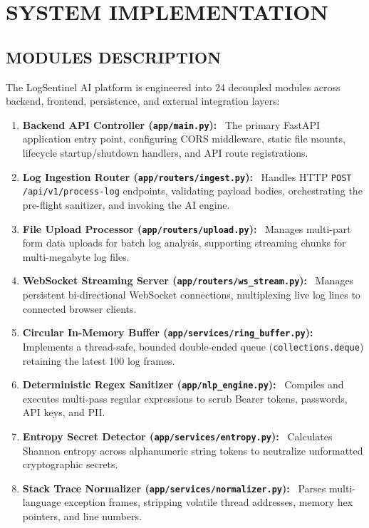 \documentclass[12pt,a4paper]{article}
\newcommand{\lead}[1]{\textbf{#1}\ }
\begin{document}
\clearpage
\section{SYSTEM IMPLEMENTATION}\label{sec:system_impl}

\subsection{MODULES DESCRIPTION}\label{sec:modules_desc}
The LogSentinel AI platform is engineered into 24 decoupled modules across backend, frontend, persistence, and external integration layers:

\begin{enumerate}[leftmargin=1.5em,itemsep=4pt]
    \item \lead{Backend API Controller (\texttt{app/main.py}):} The primary FastAPI application entry point, configuring CORS middleware, static file mounts, lifecycle startup/shutdown handlers, and API route registrations.
    \item \lead{Log Ingestion Router (\texttt{app/routers/ingest.py}):} Handles HTTP \texttt{POST /api/v1/process-log} endpoints, validating payload bodies, orchestrating the pre-flight sanitizer, and invoking the AI engine.
    \item \lead{File Upload Processor (\texttt{app/routers/upload.py}):} Manages multi-part form data uploads for batch log analysis, supporting streaming chunks for multi-megabyte log files.
    \item \lead{WebSocket Streaming Server (\texttt{app/routers/ws\_stream.py}):} Manages persistent bi-directional WebSocket connections, multiplexing live log lines to connected browser clients.
    \item \lead{Circular In-Memory Buffer (\texttt{app/services/ring\_buffer.py}):} Implements a thread-safe, bounded double-ended queue (\texttt{collections.deque}) retaining the latest 100 log frames.
    \item \lead{Deterministic Regex Sanitizer (\texttt{app/nlp\_engine.py}):} Compiles and executes multi-pass regular expressions to scrub Bearer tokens, passwords, API keys, and PII.
    \item \lead{Entropy Secret Detector (\texttt{app/services/entropy.py}):} Calculates Shannon entropy across alphanumeric string tokens to neutralize unformatted cryptographic secrets.
    \item \lead{Stack Trace Normalizer (\texttt{app/services/normalizer.py}):} Parses multi-language exception frames, stripping volatile thread addresses, memory hex pointers, and line numbers.

\end{enumerate}
\end{document}
